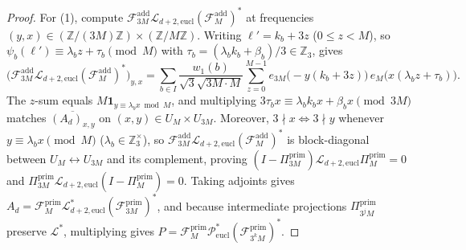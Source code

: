 \documentclass[11pt,a4paper]{article}
\numberwithin{equation}{section}
\theoremstyle{definition}
\theoremstyle{remark}
\newcommand{\Z}{\mathbb{Z}}
\newcommand{\cF}{\mathcal{F}}
\newcommand{\cP}{\mathcal{P}}
\newcommand{\cL}{\mathcal{L}}
\newcommand{\prim}{\mathrm{prim}}
\begin{document}
\begin{proof}
For (1), compute $\cF_{3M}^{\mathrm{add}}\cL_{d+2,\mathrm{eucl}}(\cF_M^{\mathrm{add}})^*$ at frequencies $(y, x) \in (\Z/(3M)\Z)\times(\Z/M\Z)$. Writing $\ell' = k_b + 3z$ ($0 \le z < M$), so $\psi_b(\ell') \equiv \lambda_b z + \tau_b \pmod M$ with $\tau_b = (\lambda_b k_b + \beta_b)/3 \in \Z_3$, gives
\[
\bigl(\cF_{3M}^{\mathrm{add}}\cL_{d+2,\mathrm{eucl}}(\cF_M^{\mathrm{add}})^*\bigr)_{y, x} = \sum_{b \in I} \frac{w_1(b)}{\sqrt{3}\sqrt{3M\cdot M}}\sum_{z=0}^{M-1} e_{3M}\bigl(-y(k_b + 3z)\bigr)\,e_M\bigl(x(\lambda_b z + \tau_b)\bigr).
\]
The $z$-sum equals $M\mathbf{1}_{y \equiv \lambda_b x \bmod M}$, and multiplying $3\tau_b x \equiv \lambda_b k_b x + \beta_b x \pmod{3M}$ matches $\overline{(A_d)_{x, y}}$ on $(x, y) \in U_M \times U_{3M}$. Moreover, $3 \nmid x \iff 3 \nmid y$ whenever $y \equiv \lambda_b x \pmod M$ ($\lambda_b \in \Z_3^\times$), so $\cF_{3M}^{\mathrm{add}}\cL_{d+2,\mathrm{eucl}}(\cF_M^{\mathrm{add}})^*$ is block-diagonal between $U_M \leftrightarrow U_{3M}$ and its complement, proving $(I - \Pi_{3M}^{\prim})\cL_{d+2,\mathrm{eucl}}\Pi_M^{\prim} = 0$ and $\Pi_{3M}^{\prim}\cL_{d+2,\mathrm{eucl}}(I - \Pi_M^{\prim}) = 0$. Taking adjoints gives $A_d = \cF_M^{\prim}\cL_{d+2,\mathrm{eucl}}^*(\cF_{3M}^{\prim})^*$, and because intermediate projections $\Pi_{3^j M}^{\prim}$ preserve $\cL^*$, multiplying gives $P = \cF_M^{\prim}\cP_{\mathrm{eucl}}^*(\cF_{3^k M}^{\prim})^*$.


\end{proof}
\end{document}
